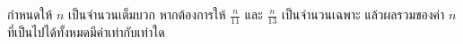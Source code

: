 ﻿%
\question กำหนดให้ $n$ เป็นจำนวนเต็มบวก หากต้องการให้ $\frac{n}{11}$ และ $\frac{n}{13}$ เป็นจำนวนเฉพาะ แล้วผลรวมของค่า $n$ ที่เป็นไปได้ทั้งหมดมีค่าเท่ากับเท่าใด
\newline
{}
